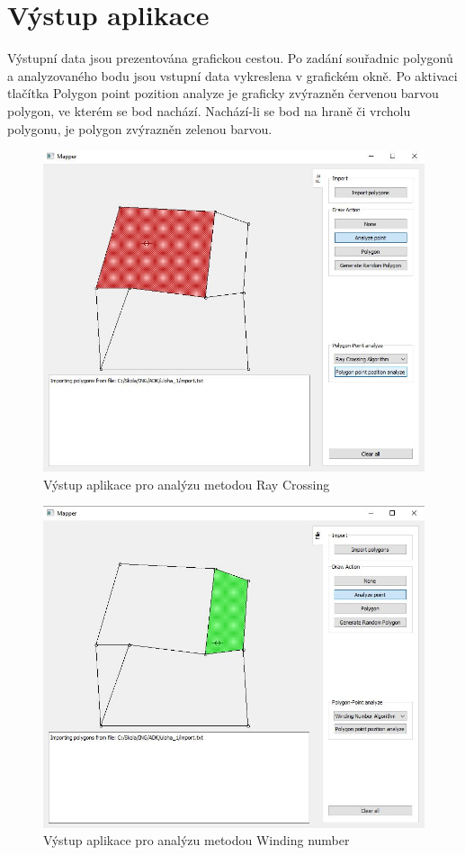 \documentclass[a4paper, 12pt]{article}
\begin{document}
\section{Výstup aplikace}
Výstupní data jsou prezentována grafickou cestou. Po zadání souřadnic polygonů a analyzovaného bodu jsou vstupní data vykreslena v grafickém okně. Po aktivaci tlačítka Polygon point pozition analyze je graficky zvýrazněn červenou barvou polygon, ve kterém se bod nachází. Nachází-li se bod na hraně či vrcholu polygonu, je polygon zvýrazněn zelenou barvou.

\begin{figure}[h!]
	\centering
	\includegraphics[width=12cm]{vystup1.jpg}
	\caption{Výstup aplikace pro analýzu metodou Ray Crossing}
\end{figure}

\begin{figure}[h!]
	\centering
	\includegraphics[width=12cm]{vystup2.jpg}
	\caption{Výstup aplikace pro analýzu metodou Winding number}
\end{figure}
\end{document}
